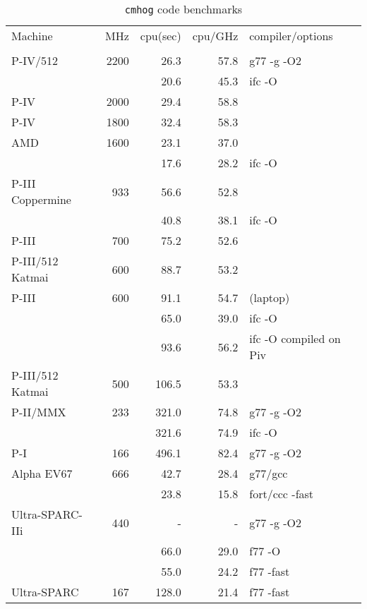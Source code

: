 \documentclass[11pt]{article}
\begin{document}
\begin{table}[htbp]
\caption[{\tt cmhog} code benchmarks]{{\tt cmhog} code benchmarks}
\centering
\medskip
\begin{tabular}{|l|r|r|r|l|} \hline
Machine      & MHz  	      & cpu(sec) & cpu/GHz & compiler/options \\ 
&&&&  \\ \hline
P-IV/512	& 2200	&	26.3 & 57.8 & g77 -g -O2 \\  %
                &       &       20.6 & 45.3 & ifc -O \\
P-IV		& 2000  &	29.4 & 58.8 &  \\  %
P-IV		& 1800  &	32.4 & 58.3 &  \\  %
AMD 		& 1600  &        23.1 & 37.0  & \\ %
                &       &        17.6 & 28.2  & ifc -O \\
P-III Coppermine & 933   &	56.6 & 52.8 & \\ %
                 &       &      40.8 & 38.1 & ifc -O \\
P-III		& 700   &	75.2 & 52.6 & \\ %
P-III/512 Katmai & 600	&	88.7 & 53.2 &  \\ %
P-III		& 600	&	91.1 & 54.7 & (laptop) \\ %
 		& 	&	65.0 & 39.0 & ifc -O \\
		&	&	93.6 & 56.2 & ifc -O compiled on Piv \\
P-III/512 Katmai & 500  &	106.5 & 53.3 & \\  %
P-II/MMX        & 233   &       321.0 & 74.8 & g77 -g -O2 \\ %
		&	&	321.6 & 74.9 & ifc -O \\
P-I             & 166   &       496.1 & 82.4 & g77 -g -O2 \\ %
Alpha EV67	& 666   &        42.7 & 28.4 & g77/gcc \\ %
		&       &        23.8 & 15.8 & fort/ccc -fast \\
Ultra-SPARC-IIi &  440  &	   -  &   -  & g77 -g -O2\\   %
		&  	&	 66.0 & 29.0 & f77 -O \\
		&  	&	 55.0 & 24.2 & f77 -fast \\
Ultra-SPARC     &  167  &       128.0 & 21.4 & f77 -fast \\
 \hline
\end{tabular}
\end{table}
\end{document}
